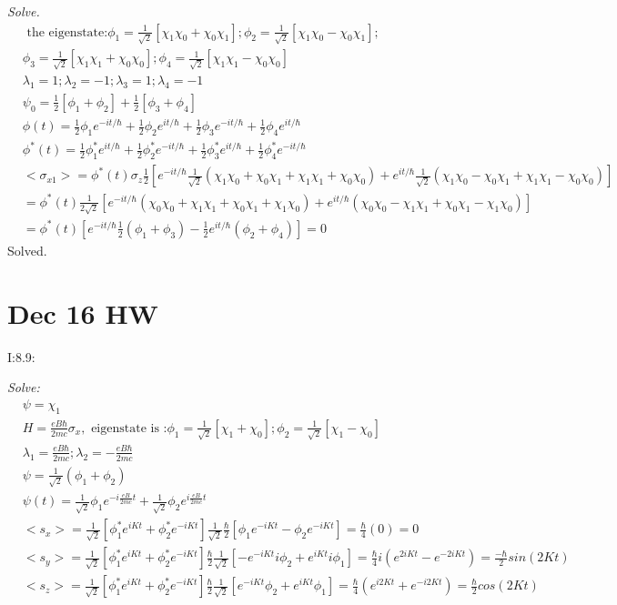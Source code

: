 \documentclass{article}
\begin{document}
\textit{Solve.}
\begin{align*}
&\text{ the eigenstate:}\phi_1=\frac1{\sqrt{2}}[\chi_1\chi_0+\chi_0\chi_1];\phi_2=\frac1{\sqrt{2}}[\chi_1\chi_0-\chi_0\chi_1];\\&\phi_3=\frac1{\sqrt{2}}[\chi_1\chi_1+\chi_0\chi_0];\phi_4=\frac1{\sqrt{2}}[\chi_1\chi_1-\chi_0\chi_0]\\
&\lambda_1=1;\lambda_2=-1;\lambda_3=1;\lambda_4=-1\\
&\psi_0=\frac12[\phi_1+\phi_2]+\frac12[\phi_3+\phi_4]\\
&\phi(t)=\frac12\phi_1e^{-it/\hbar}+\frac12\phi_2e^{it/\hbar}+\frac12\phi_3e^{-it/\hbar}+\frac12\phi_4e^{it/\hbar}\\
&\phi^*(t)=\frac12\phi_1^*e^{it/\hbar}+\frac12\phi_2^*e^{-it/\hbar}+\frac12\phi_3^*e^{it/\hbar}+\frac12\phi_4^*e^{-it/\hbar} \\
&<\sigma_{x1}>=\phi^*(t)\sigma_z\frac12[e^{-it/\hbar}\frac1{\sqrt{2}}(\chi_1\chi_0+\chi_0\chi_1+\chi_1\chi_1+\chi_0\chi_0)+e^{it/\hbar}\frac1{\sqrt{2}}(\chi_1\chi_0-\chi_0\chi_1+\chi_1\chi_1-\chi_0\chi_0)]\\
&=\phi^*(t)\frac1{2\sqrt{2}}[e^{-it/\hbar}(\chi_0\chi_0+\chi_1\chi_1+\chi_0\chi_1+\chi_1\chi_0)+e^{it/\hbar}(\chi_0\chi_0-\chi_1\chi_1+\chi_0\chi_1-\chi_1\chi_0)]\\
&=\phi^*(t)[e^{-it/\hbar}\frac12(\phi_1+\phi_3)-\frac12e^{it/\hbar}(\phi_2+\phi_4)]=0
\end{align*}
Solved.

\newpage
\section{Dec 16 HW}

I:8.9:

\textit{Solve:}
\begin{align*}
&\psi=\chi_1\\
&H=\frac{eB\hbar}{2mc}\sigma_x,\text{ eigenstate is :}\phi_1=\frac1{\sqrt{2}}[\chi_1+\chi_0];\phi_2=\frac1{\sqrt{2}}[\chi_1-\chi_0] \\
&\lambda_1=\frac{eB\hbar}{2mc};\lambda_2=-\frac{eB\hbar}{2mc} \\
&\psi=\frac1{\sqrt{2}}(\phi_1+\phi_2) \\
&\psi(t)=\frac1{\sqrt{2}}\phi_1e^{-i\frac{eB}{2mc}t}+\frac1{\sqrt{2}}\phi_2e^{i\frac{eB}{2mc}t} \\
&<s_x>=\frac1{\sqrt{2}}[\phi_1^*e^{iKt}+\phi_2^*e^{-iKt}]\frac1{\sqrt{2}}\frac{\hbar}2[\phi_1e^{-iKt}-\phi_2e^{-iKt}]=\frac{\hbar}4(0)=0 \\
&<s_y>=\frac1{\sqrt{2}}[\phi_1^*e^{iKt}+\phi_2^*e^{-iKt}]\frac{\hbar}2\frac1{\sqrt{2}}[-e^{-iKt}i\phi_2+e^{iKt}i\phi_1 ]=\frac{\hbar}4i(e^{2iKt}-e^{-2iKt})=\frac{-\hbar}2sin(2Kt)\\
&<s_z>=\frac1{\sqrt{2}}[\phi_1^*e^{iKt}+\phi_2^*e^{-iKt}]\frac{\hbar}2\frac1{\sqrt{2}}[e^{-iKt}\phi_2+e^{iKt}\phi_1]=\frac{\hbar}4(e^{i2Kt}+e^{-i2Kt})=\frac{\hbar}2cos(2Kt)
\end{align*}
\end{document}

